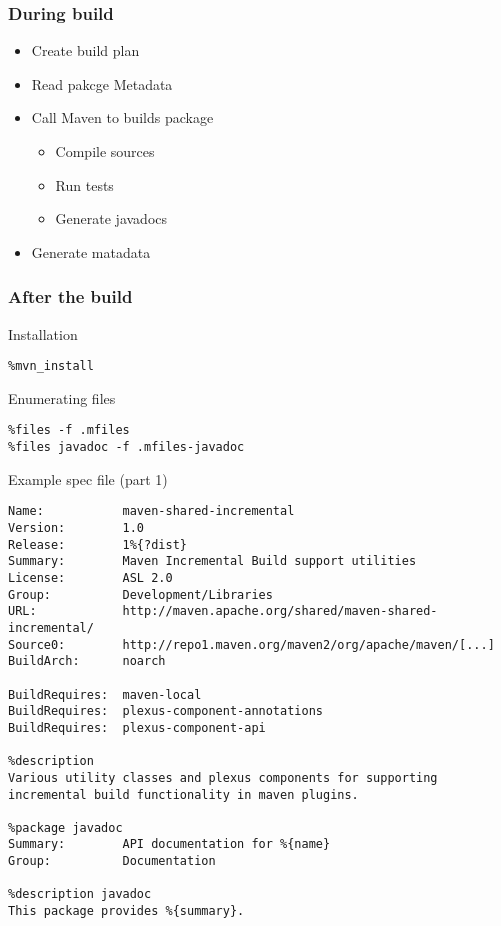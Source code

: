 \documentclass[pdftex,unicode,xcolor=table]{beamer}
\begin{document}
\begin{frame}
  \frametitle{During build}
  \begin{itemize}
    \item Create build plan
    \item Read pakcge Metadata
    \item Call Maven to builds package
    \begin{itemize}
      \item Compile sources
      \item Run tests
      \item Generate javadocs
    \end{itemize}
    \item Generate matadata
  \end{itemize}
\end{frame}


\begin{frame}[fragile]
  \frametitle{After the build}
  \begin{block}{Installation}
    \scriptsize
\begin{verbatim}
%mvn_install
\end{verbatim}
  \end{block}
  \begin{block}{Enumerating files}
    \scriptsize
\begin{verbatim}
%files -f .mfiles
%files javadoc -f .mfiles-javadoc
\end{verbatim}
  \end{block}
\end{frame}


\begin{frame}[fragile]
  \begin{block}{Example spec file (part 1)}
    \scriptsize
\begin{verbatim}
Name:           maven-shared-incremental
Version:        1.0
Release:        1%{?dist}
Summary:        Maven Incremental Build support utilities
License:        ASL 2.0
Group:          Development/Libraries
URL:            http://maven.apache.org/shared/maven-shared-incremental/
Source0:        http://repo1.maven.org/maven2/org/apache/maven/[...]
BuildArch:      noarch

BuildRequires:  maven-local
BuildRequires:  plexus-component-annotations
BuildRequires:  plexus-component-api

%description
Various utility classes and plexus components for supporting
incremental build functionality in maven plugins.

%package javadoc
Summary:        API documentation for %{name}
Group:          Documentation

%description javadoc
This package provides %{summary}.
\end{verbatim}
  \end{block}
\end{frame}
\end{document}
